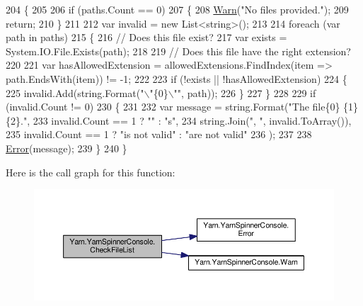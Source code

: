\begin{DoxyCode}
204         \{
205 
206             \textcolor{keywordflow}{if} (paths.Count == 0)
207             \{
208                 \hyperlink{a00189_a979bb6f049b6c5294f745a19e24ddd9d}{Warn}(\textcolor{stringliteral}{"No files provided."});
209                 \textcolor{keywordflow}{return};
210             \}
211 
212             var invalid = \textcolor{keyword}{new} List<string>();
213 
214             \textcolor{keywordflow}{foreach} (var path \textcolor{keywordflow}{in} paths)
215             \{
216                 \textcolor{comment}{// Does this file exist?}
217                 var exists = System.IO.File.Exists(path);
218 
219                 \textcolor{comment}{// Does this file have the right extension?}
220 
221                 var hasAllowedExtension = allowedExtensions.FindIndex(item => path.EndsWith(item)) != -1;
222 
223                 \textcolor{keywordflow}{if} (!exists || !hasAllowedExtension)
224                 \{
225                     invalid.Add(string.Format(\textcolor{stringliteral}{"\(\backslash\)"\{0\}\(\backslash\)""}, path));
226                 \}
227             \}
228 
229             \textcolor{keywordflow}{if} (invalid.Count != 0)
230             \{
231 
232                 var message = string.Format(\textcolor{stringliteral}{"The file\{0\} \{1\} \{2\}."},
233                     invalid.Count == 1 ? \textcolor{stringliteral}{""} : \textcolor{stringliteral}{"s"},
234                                             string.Join(\textcolor{stringliteral}{", "}, invalid.ToArray()),
235                     invalid.Count == 1 ? \textcolor{stringliteral}{"is not valid"} : \textcolor{stringliteral}{"are not valid"}
236                 );
237 
238                 \hyperlink{a00189_a2f63f9f5b7634cb50ee75ff2eb18b137}{Error}(message);
239             \}
240         \}
\end{DoxyCode}


Here is the call graph for this function\-:
\nopagebreak
\begin{figure}[H]
\begin{center}
\leavevmode
\includegraphics[width=350pt]{a00189_ad77564b25725a771f0fd4da430582e6f_cgraph}
\end{center}
\end{figure}




